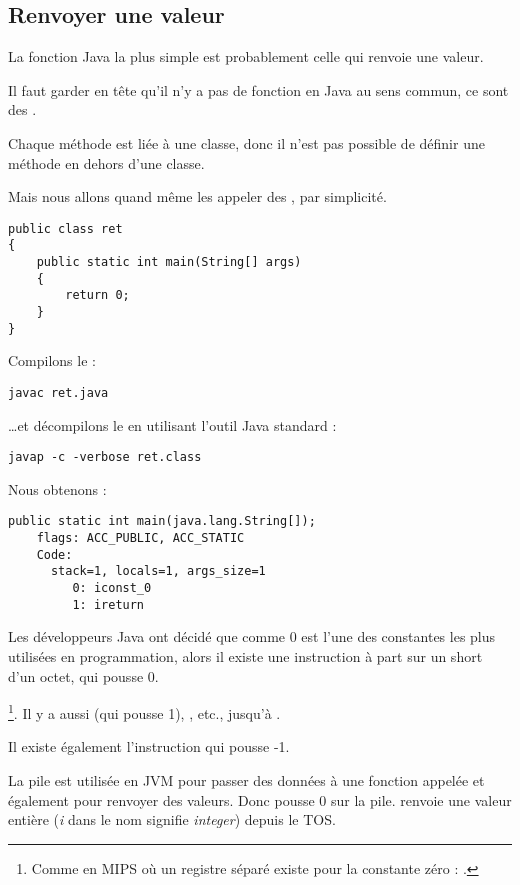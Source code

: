 \subsection{Renvoyer une valeur}

La fonction Java la plus simple est probablement celle qui renvoie une valeur.

Il faut garder en tête qu'il n'y a pas de fonction  en Java au sens commun,
ce sont des .

Chaque méthode est liée à une classe, donc il n'est pas possible de définir
une méthode en dehors d'une classe.

Mais nous allons quand même les appeler des , par simplicité.

\begin{lstlisting}[style=customjava]
public class ret
{
	public static int main(String[] args) 
	{
		return 0;
	}
}
\end{lstlisting}

Compilons le :

\begin{lstlisting}
javac ret.java
\end{lstlisting}

\dots et décompilons le en utilisant l'outil Java standard :

\begin{lstlisting}
javap -c -verbose ret.class
\end{lstlisting}

Nous obtenons :

\begin{lstlisting}[caption=JDK 1.7 (excerpt)]
  public static int main(java.lang.String[]);
    flags: ACC_PUBLIC, ACC_STATIC
    Code:
      stack=1, locals=1, args_size=1
         0: iconst_0      
         1: ireturn       
\end{lstlisting}

Les développeurs Java ont décidé que comme 0 est l'une des constantes les plus utilisées en programmation,
alors il existe une instruction à part sur un short d'un octet,  qui pousse 0.

\footnote{Comme en MIPS où un registre séparé existe pour la constante zéro : .}.
Il y a aussi  (qui pousse 1), , etc., jusqu'à .

Il existe également l'instruction  qui pousse -1.

La pile est utilisée en JVM pour passer des données à une fonction appelée et également pour renvoyer des valeurs.
Donc  pousse 0 sur la pile.
 renvoie une valeur entière (\emph{i} dans le nom signifie \emph{integer}) depuis le \ac{TOS}.

